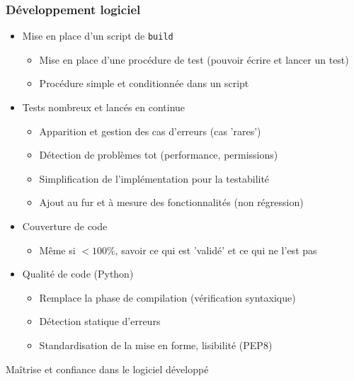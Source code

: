 \documentclass[9pt]{beamer}
\begin{document}
\subsubsection{Développement logiciel}
\begin{frame}{\subsubsecname}{\subsecname}

  \begin{itemize}
    \item <2-> Mise en place d'un script de \texttt{build}
      \begin{itemize}
        \item Mise en place d'une procédure de test (pouvoir écrire et lancer un test)
        \item Procédure simple et conditionnée dans un script
      \end{itemize}
    \item <3->Tests nombreux et lancés en continue
      \begin{itemize}
        \item Apparition et gestion des cas d'erreurs (cas 'rares')
        \item Détection de problèmes tot (performance, permissions)
        \item Simplification de l'implémentation pour la testabilité
        \item Ajout au fur et à mesure des fonctionnalités (non régression)
      \end{itemize}
    \item <4-> Couverture de code
      \begin{itemize}
        \item Même si $<100\%$, savoir ce qui est 'validé' et ce qui ne l'est pas
      \end{itemize}
    \item <5-> Qualité de code (Python)
      \begin{itemize}
        \item Remplace la phase de compilation (vérification syntaxique)
        \item Détection statique d'erreurs
        \item Standardisation de la mise en forme, lisibilité (PEP8)
      \end{itemize}
  \end{itemize}
   Maîtrise et confiance dans le logiciel développé
\end{frame}
\end{document}
